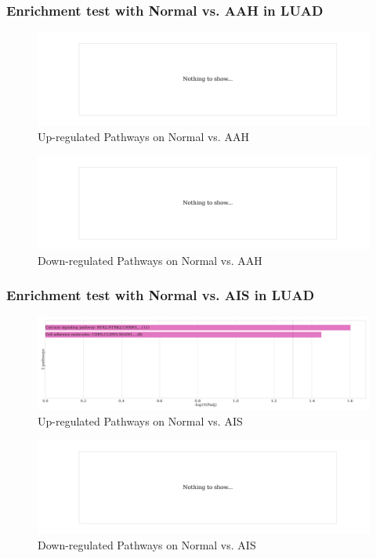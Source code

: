 \documentclass{beamer}
\begin{document}
    \begin{frame}
        \frametitle{Enrichment test with Normal vs. AAH in LUAD}

        \begin{figure}
            \includegraphics[width=0.8 \linewidth]{figures/DEG/Enrichment/STAR.ADC.Normal-AAH.Up.KEGG.pdf}
            \caption{Up-regulated Pathways on Normal vs. AAH}
        \end{figure}

        \begin{figure}
            \includegraphics[width=0.8 \linewidth]{figures/DEG/Enrichment/STAR.ADC.Normal-AAH.Down.KEGG.pdf}
            \caption{Down-regulated Pathways on Normal vs. AAH}
        \end{figure}
    \end{frame}

    \begin{frame}
        \frametitle{Enrichment test with Normal vs. AIS in LUAD}

        \begin{figure}
            \includegraphics[width=0.8 \linewidth]{figures/DEG/Enrichment/STAR.ADC.Normal-AIS.Up.KEGG.pdf}
            \caption{Up-regulated Pathways on Normal vs. AIS}
        \end{figure}

        \begin{figure}
            \includegraphics[width=0.8 \linewidth]{figures/DEG/Enrichment/STAR.ADC.Normal-AIS.Down.KEGG.pdf}
            \caption{Down-regulated Pathways on Normal vs. AIS}
        \end{figure}
    \end{frame}
\end{document}
